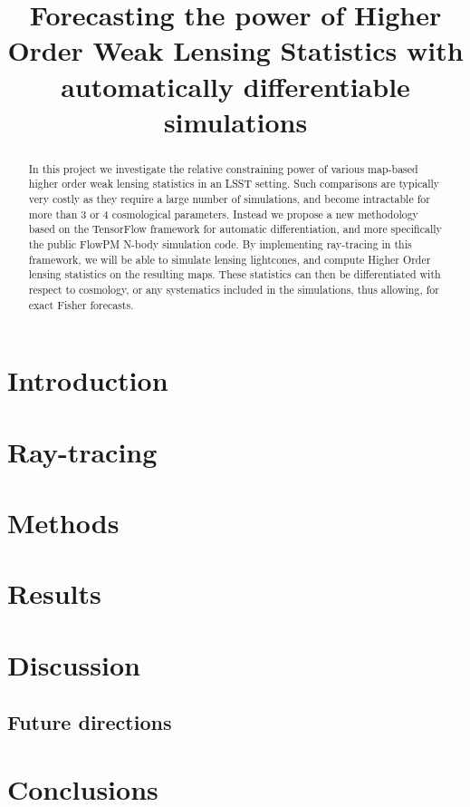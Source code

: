 \documentclass[twocolumn,twocolappendix]{aastex63}
\begin{document}
\title{Forecasting the power of Higher Order Weak Lensing Statistics with automatically differentiable simulations}


\begin{abstract}
In this project we investigate the relative constraining power of various map-based higher order weak lensing statistics in an LSST setting. Such comparisons are typically very costly as they require a large number of simulations, and become intractable for more than 3 or 4 cosmological parameters. Instead we propose a new methodology based on the TensorFlow framework for automatic differentiation, and more specifically the public FlowPM N-body simulation code. By implementing ray-tracing in this framework, we will be able to simulate lensing lightcones, and compute Higher Order lensing statistics on the resulting maps. These statistics can then be differentiated with respect to cosmology, or any systematics included in the simulations, thus allowing, for exact Fisher forecasts.
\end{abstract}





\section{Introduction}

\section{Ray-tracing}

\section{Methods}

\section{Results}


\section{Discussion}

\subsection{Future directions}

\section{Conclusions}

\end{document}
